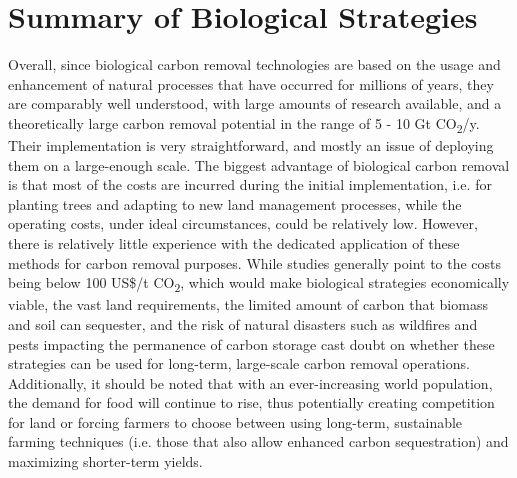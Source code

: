 \section{Summary of Biological Strategies}
Overall, since biological carbon removal technologies are based on the usage and enhancement of natural processes that have occurred for millions of years, they are comparably well understood, with large amounts of research available, and a theoretically large carbon removal potential in the range of 5 - 10 Gt CO\textsubscript{2}/y. Their implementation is very straightforward, and mostly an issue of deploying them on a large-enough scale. The biggest advantage of biological carbon removal is that most of the costs are incurred during the initial implementation, i.e. for planting trees and adapting to new land management processes, while the operating costs, under ideal circumstances, could be relatively low. However, there is relatively little experience with the dedicated application of these methods for carbon removal purposes. While studies generally point to the costs being below 100 US\$/t CO\textsubscript{2}, which would make biological strategies economically viable, the vast land requirements, the limited amount of carbon that biomass and soil can sequester, and the risk of natural disasters such as wildfires and pests impacting the permanence of carbon storage cast doubt on whether these strategies can be used for long-term, large-scale carbon removal operations.\\Additionally, it should be noted that with an ever-increasing world population, the demand for food will continue to rise, thus potentially creating competition for land or forcing farmers to choose between using long-term, sustainable farming techniques (i.e. those that also allow enhanced carbon sequestration) and maximizing shorter-term yields.